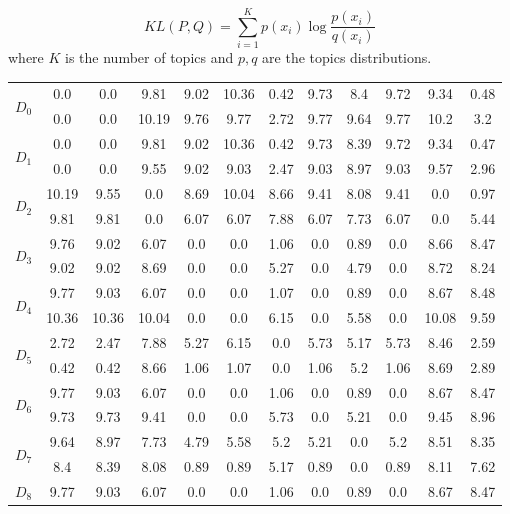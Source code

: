 \begin{equation}
KL(P,Q) = \sum\limits_{i=1}^K p(x_{i}) \log \frac{p(x_{i})}{q(x_{i})}
\label{eq:kl}
\end{equation}
where  $K$ is the number of topics and $p,q$ are the topics distributions.

\begin{table}[!htbp]
\centering%
\small
\begin{tabularx}{\linewidth}{CCCCCCCCCCCC}
\toprule
\heading{} &  &  &  &  &  &  &  &  &  &  &  \\
\midrule
\midrule
{}&0.0&0.0&9.81&9.02&10.36&0.42&9.73&8.4&9.72&9.34&0.48\\
&0.0&0.0&10.19&9.76&9.77&2.72&9.77&9.64&9.77&10.2&3.2\\
\midrule
{}&0.0&0.0&9.81&9.02&10.36&0.42&9.73&8.39&9.72&9.34&0.47\\
&0.0&0.0&9.55&9.02&9.03&2.47&9.03&8.97&9.03&9.57&2.96\\
\midrule
{}&10.19&9.55&0.0&8.69&10.04&8.66&9.41&8.08&9.41&0.0&0.97\\
&9.81&9.81&0.0&6.07&6.07&7.88&6.07&7.73&6.07&0.0&5.44\\
\midrule
{}&9.76&9.02&6.07&0.0&0.0&1.06&0.0&0.89&0.0&8.66&8.47\\
&9.02&9.02&8.69&0.0&0.0&5.27&0.0&4.79&0.0&8.72&8.24\\
\midrule
{}&9.77&9.03&6.07&0.0&0.0&1.07&0.0&0.89&0.0&8.67&8.48\\
&10.36&10.36&10.04&0.0&0.0&6.15&0.0&5.58&0.0&10.08&9.59\\
\midrule
{}&2.72&2.47&7.88&5.27&6.15&0.0&5.73&5.17&5.73&8.46&2.59\\
&0.42&0.42&8.66&1.06&1.07&0.0&1.06&5.2&1.06&8.69&2.89\\
\midrule
{}&9.77&9.03&6.07&0.0&0.0&1.06&0.0&0.89&0.0&8.67&8.47\\
&9.73&9.73&9.41&0.0&0.0&5.73&0.0&5.21&0.0&9.45&8.96\\
\midrule
{}&9.64&8.97&7.73&4.79&5.58&5.2&5.21&0.0&5.2&8.51&8.35\\
&8.4&8.39&8.08&0.89&0.89&5.17&0.89&0.0&0.89&8.11&7.62\\
\midrule
{}&9.77&9.03&6.07&0.0&0.0&1.06&0.0&0.89&0.0&8.67&8.47\\

\end{tabularx}
\end{table}
